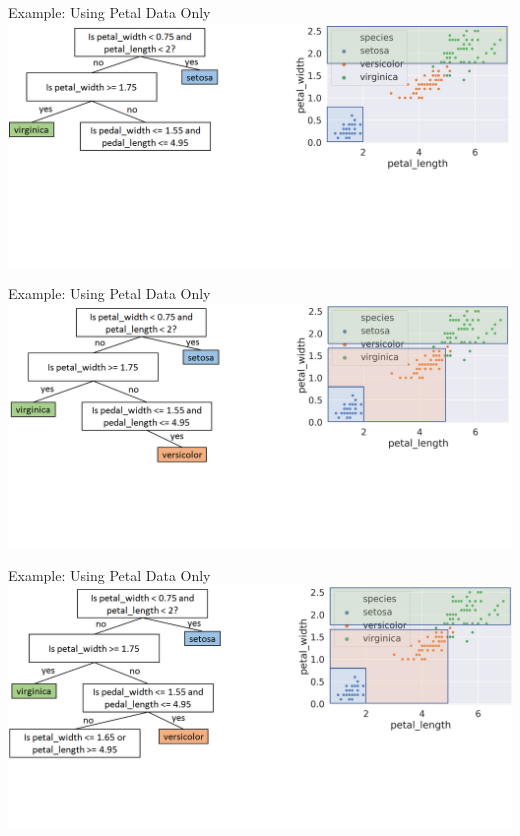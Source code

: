 \documentclass[aspectratio=169]{../latex_main/tntbeamer}  %
\begin{document}
	
	\begin{frame}{Example: Using Petal Data Only}
	        \includegraphics[scale=.34]{Bild10}
	\end{frame}
	
	
	\begin{frame}{Example: Using Petal Data Only}
	        \includegraphics[scale=.34]{Bild11}
	\end{frame}
	
	
	\begin{frame}{Example: Using Petal Data Only}
	        \includegraphics[scale=.34]{Bild12}
	\end{frame}
	
\end{document}
